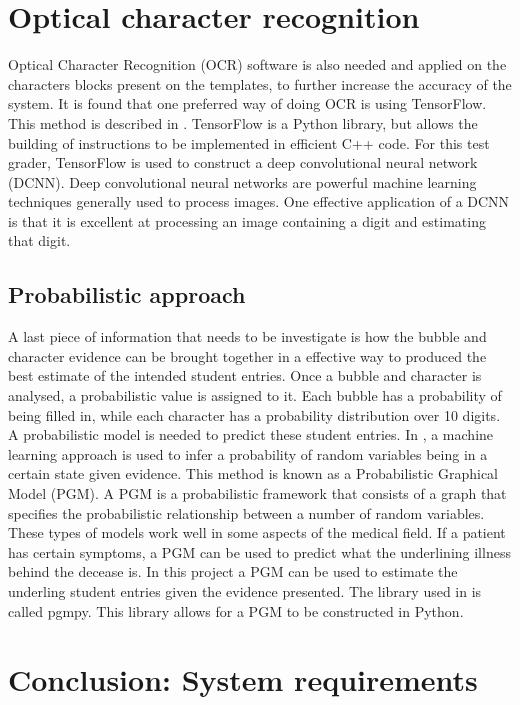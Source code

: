 \section{Optical character recognition}
Optical Character Recognition (OCR) software is also needed and applied on the characters blocks present on the templates, to further increase the accuracy of the system. It is found that one preferred way of doing OCR is using TensorFlow. This method is described in \citet{Tensor}. TensorFlow is a Python library, but allows the building of instructions to be implemented in ef{f}icient C++ code. For this test grader, TensorFlow is used to construct a deep convolutional neural network (DCNN). Deep convolutional neural networks are powerful machine learning techniques generally used to process images. One effective application of a DCNN is that it is excellent at processing an image containing a digit and estimating that digit.

\subsection{Probabilistic approach}

A last piece of information that needs to be investigate is how the bubble and character evidence can be brought together in a effective way to produced the best estimate of the intended student entries. Once a bubble and character is analysed, a probabilistic value is assigned to it. Each bubble has a probability of being filled in, while each character has a probability distribution over 10 digits. A probabilistic model is needed to predict these student entries. In \citet{pgmPy}, a machine learning approach is used to infer a probability of random variables being in a certain state given evidence. This method is known as a Probabilistic Graphical Model (PGM). A PGM is a probabilistic framework that consists of a graph that specifies the probabilistic relationship between a number of random variables. These types of models work well in some aspects of the medical field. If a patient has certain symptoms, a PGM can be used to predict what the underlining illness behind the decease is. In this project a PGM can be used to estimate the underling student entries given the evidence presented. The library used in \citet{pgmPy} is called pgmpy. This library allows for a PGM to be constructed in Python. 

\section{Conclusion: System requirements}

